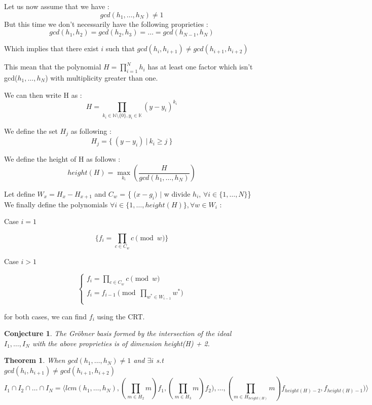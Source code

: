 \documentclass{article}
\newtheorem{theorem}{Theorem}[section]
\newtheorem{conjecture}{Conjecture}[section]
\begin{document}
\begin{flushleft}

Let us now assume that we have : 
\[gcd(h_{1},\dots,h_{N}) \neq 1\]
But this time we don't necessarily have the following proprieties :
\[gcd(h_{1},h_{2}) = gcd(h_{2},h_{3}) = \dots = gcd(h_{N-1},h_{N}) \]

Which implies that there exist $i$ such that $gcd(h_{i},h_{i+1}) \neq gcd(h_{i+1},h_{i+2})$

This mean that the polynomial $H = \prod_{i=1}^{N} h_{i}$ has at least one factor which isn't gcd($h_{1},\dots,h_{N}$) with multiplicity greater than one.

We can then write H as :
\[H=\prod_{k_{i} \in \mathbb{N}
 \setminus \{0\}, y_{i}\in \mathbb{K}} (y-y_{i})^{k_{i}}\]

We define the set $H_{j}$ as following :
\[H_{j} = \{\ (y-y_{i}) \ |\  k_{i} \geq j\ \}\]

We define the height of H as follows : \[height(H) = \max_{k_{i}}(\frac{H}{gcd(h_{1},\dots,h_{N})})\]

Let define $W_{x} = H_{x}-H_{x+1}$ and $C_{w}$ = \{ ($x-g_{i})$ $|$ w divide $h_{i}$, $\forall i \in \{1,\dots,N\}$\}\newline
We finally define the polynomials $\forall i \in \{1,\dots,height(H)\}, \forall w \in W_{i}$ :

Case $i = 1$

\[\{ f_{i} = \prod_{c \in C_{w} } c \pmod w \}\]

Case $i > 1$

\begin{displaymath}
    \left\{
    \begin{array}{ll}
    f_{i} = \prod_{c \in C_{w} } c \pmod w \\
    f_{i} = f_{i-1} \pmod{\prod_{w^{*} \in W_{i-1}} w^{*}}\\
    \end{array}
    \right.
\end{displaymath}

for both cases, we can find $f_{i}$ using the CRT\@.

\begin{conjecture}
    The Gröbner basis formed by the intersection of the ideal $I_{1},\dots,I_{N}$ with the above proprieties is of dimension height(H) + 2.
\end{conjecture}


\begin{theorem}
     When $gcd(h_{1},\dots,h_{N}) \neq 1$ and $\exists i$ s.t $gcd(h_{i},h_{i+1}) \neq gcd(h_{i+1},h_{i+2})$
    \begin{displaymath}
        I_{1} \cap I_{2} \cap \dots \cap I_{N} = \langle lcm(h_{1},\dots,h_{N}),(\prod_{m \in H_{2}} m)f_{1},(\prod_{m \in H_{3}} m)f_{2}),\dots,(\prod_{m \in H_{height(H)}} m)f_{height(H)-2},f_{height(H)-1})\rangle
    \end{displaymath}
\end{theorem}


\end{flushleft}
\end{document}
